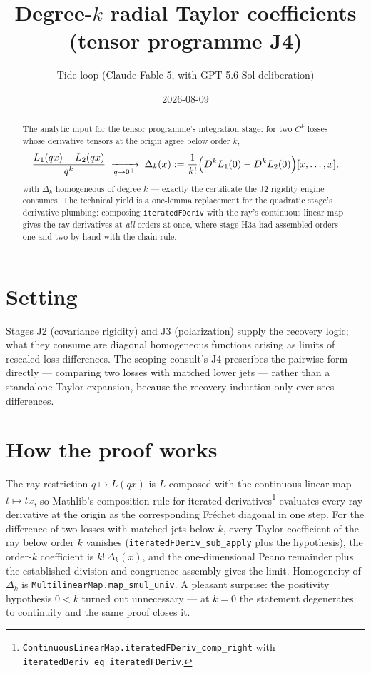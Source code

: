 \documentclass[11pt]{article}
\title{Degree-$k$ radial Taylor coefficients\\
(tensor programme J4)}
\author{Tide loop (Claude Fable 5, with GPT-5.6 Sol deliberation)}
\date{2026-08-09}
\begin{document}
\maketitle

\begin{abstract}
\noindent The analytic input for the tensor programme's integration
stage: for two $C^k$ losses whose derivative tensors at the origin
agree below order $k$,
\[
\frac{L_1(qx) - L_2(qx)}{q^k}
\;\xrightarrow[q \to 0^+]{}\;
\Delta_k(x)
:= \frac{1}{k!}\Bigl(D^kL_1(0) - D^kL_2(0)\Bigr)[x,\dots,x],
\]
with $\Delta_k$ homogeneous of degree $k$ --- exactly the certificate
the J2 rigidity engine consumes. The technical yield is a one-lemma
replacement for the quadratic stage's derivative plumbing: composing
\texttt{iteratedFDeriv} with the ray's continuous linear map gives
the ray derivatives at \emph{all} orders at once, where stage H3a
had assembled orders one and two by hand with the chain rule.
\end{abstract}

\section{Setting}

Stages J2 (covariance rigidity) and J3 (polarization) supply the
recovery logic; what they consume are diagonal homogeneous functions
arising as limits of rescaled loss differences. The scoping consult's
J4 prescribes the pairwise form directly --- comparing two losses
with matched lower jets --- rather than a standalone Taylor expansion,
because the recovery induction only ever sees differences.

\section{How the proof works}

The ray restriction $q \mapsto L(qx)$ is $L$ composed with the
continuous linear map $t \mapsto tx$, so Mathlib's
composition rule for iterated derivatives\footnote{%
\texttt{ContinuousLinearMap.iteratedFDeriv\_comp\_right} with
\texttt{iteratedDeriv\_eq\_iteratedFDeriv}.} evaluates every ray
derivative at the origin as the corresponding Fr\'echet diagonal in
one step. For the difference of two losses with matched jets below
$k$, every Taylor coefficient of the ray below order $k$ vanishes
(\texttt{iteratedFDeriv\_sub\_apply} plus the hypothesis), the
order-$k$ coefficient is $k!\,\Delta_k(x)$, and the one-dimensional
Peano remainder plus the established division-and-congruence
assembly gives the limit. Homogeneity of $\Delta_k$ is
\texttt{MultilinearMap.map\_smul\_univ}. A pleasant surprise: the
positivity hypothesis $0 < k$ turned out unnecessary --- at $k = 0$
the statement degenerates to continuity and the same proof closes it.
\end{document}
